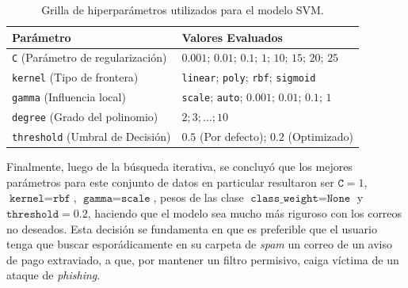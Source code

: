 \documentclass[a4paper,11pt ,openany]{book}
\begin{document}
{\begin{table}[htbp]
\centering
\caption{Grilla de hiperparámetros utilizados para el modelo SVM.}
\label{tab:svm_grid}
\renewcommand{\arraystretch}{1.5}
\begin{tabular}{|l|l|}
\hline
\textbf{Parámetro} & \textbf{Valores Evaluados} \\
\hline
\texttt{C} (Parámetro de regularización) & $0.001$; $0.01$; $0.1$; $1$; $10$; $15$; $20$; $25$ \\
\hline
\texttt{kernel} (Tipo de frontera) & \texttt{linear}; \texttt{poly}; \texttt{rbf}; \texttt{sigmoid} \\
\hline
\texttt{gamma} (Influencia local) & \texttt{scale}; \texttt{auto}; $0.001$; $0.01$; $0.1$; $1$ \\
\hline
\texttt{degree} (Grado del polinomio) & $2; 3; \dots; 10$ \\
\hline
\texttt{threshold} (Umbral de Decisión) & $0.5$ (Por defecto); $0.2$ (Optimizado) \\
\hline
\end{tabular}
\end{table}

%

Finalmente, luego de la búsqueda iterativa, se concluyó que los mejores parámetros para este conjunto de datos en particular resultaron ser $\texttt{C}=1$, $\texttt{kernel}=\texttt{rbf}$, $\texttt{gamma}=\texttt{scale}$, pesos de las clase $\texttt{class\_weight}=\texttt{None}$ y $\texttt{threshold}=0.2$, haciendo que el modelo sea mucho más riguroso con los correos no deseados. Esta decisión se fundamenta en que es preferible que el usuario tenga que buscar esporádicamente en su carpeta de \textit{spam} un correo de un aviso de pago extraviado, a que, por mantener un filtro permisivo, caiga víctima de un ataque de \textit{phishing}.}
\end{document}
